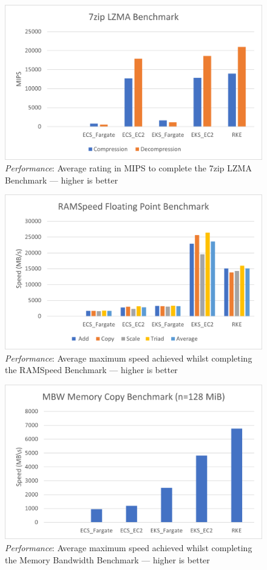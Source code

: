 \begin{figure}[hp]
  \includegraphics{images/perf-7zip.png}
  \caption{\emph{Performance}: Average rating in MIPS to complete the 7zip LZMA Benchmark --- higher is better}
  \label{fig:perf_7zip}
\end{figure}

\begin{figure}[hp]
  \includegraphics{images/perf-RAMSpeed.png}
  \caption{\emph{Performance}: Average maximum speed achieved whilst completing the RAMSpeed Benchmark --- higher is better}
  \label{fig:perf_RAMSpeed}
\end{figure}

\begin{figure}[hp]
  \includegraphics{images/perf-MBW.png}
  \caption{\emph{Performance}: Average maximum speed achieved whilst completing the Memory Bandwidth Benchmark --- higher is better}
  \label{fig:perf_MBW}
\end{figure}

